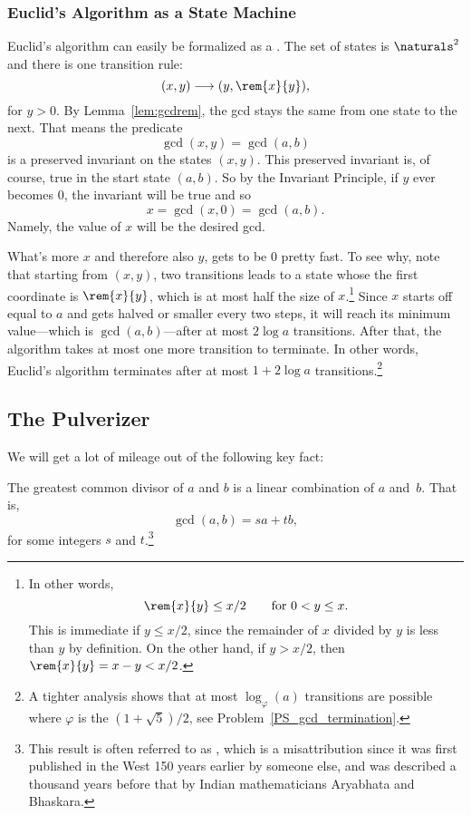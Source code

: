 \subsubsection{Euclid's Algorithm as a State Machine}
Euclid's algorithm can easily be formalized as a .  The set of states is $\naturals^2$ and there is one
transition rule:
\begin{equation}\label{euclid_transition}
(x,y) \movesto (y, \rem{x}{y}),
\end{equation}
for $y>0$.  By Lemma~\ref{lem:gcdrem}, the gcd stays the same from one
state to the next.  That means the predicate
\[
\gcd(x,y) = \gcd(a,b)
\]
is a preserved invariant on the states $(x,y)$.  This preserved
invariant is, of course, true in the start state $(a,b)$.  So by the
Invariant Principle, if $y$ ever becomes $0$, the invariant will be
true and so
\[
x = \gcd(x,0) = \gcd(a,b).
\]
Namely, the value of $x$ will be the desired gcd.

What's more $x$ and therefore also $y$, gets to be 0 pretty fast.
To see why, note that starting from $(x,y)$, two transitions leads to
a state whose the first coordinate is $\rem{x}{y}$, which is at most
half the size of $x$.\footnote{In other words,
\begin{equation}\label{rxylx2}
\rem{x}{y} \le x/2 \qquad \text{for $0 < y \le x$}.
\end{equation}
This is immediate if $y \le x/2$, since the remainder of $x$ divided
by $y$ is less than $y$ by definition.  On the other hand, if $y >
x/2$, then $\rem{x}{y} = x - y < x/2$.}  Since $x$ starts off equal to
$a$ and gets halved or smaller every two steps, it will reach its
minimum value---which is $\gcd(a,b)$---after at most $2 \log a$
transitions.  After that, the algorithm takes at most one more
transition to terminate.  In other words, Euclid's algorithm
terminates after at most $1+2 \log a$ transitions.\footnote{A tighter
  analysis shows that at most $\log_\varphi(a)$ transitions are
  possible where $\varphi$ is the  $(1 +
  \sqrt{5})/2$, see Problem~\ref{PS_gcd_termination}.}

\subsection{The Pulverizer}\label{sec:pulverizer}
We will get a lot of mileage out of the following key fact:
\begin{theorem}\label{gcd_is_lin_thm}
The greatest common divisor of $a$ and $b$ is a linear combination of
$a$ and~$b$.  That is,
\[
\gcd(a, b) = s a + t b,
\]
for some integers $s$ and $t$.\footnote{This result is often referred
  to as \emph{}, which is a misattribution since
  it was first published in the West 150 years earlier by someone
  else, and was described a thousand years before that by Indian
  mathematicians Aryabhata and Bhaskara.}
\end{theorem}

